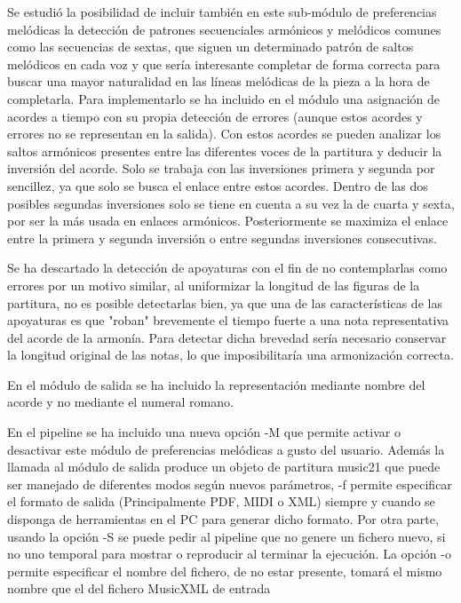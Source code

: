 Se estudió la posibilidad de incluir también en este sub-módulo de preferencias melódicas la detección de patrones secuenciales armónicos y melódicos comunes como las secuencias de sextas, que siguen un determinado patrón de saltos melódicos en cada voz y que sería interesante completar de forma correcta para buscar una mayor naturalidad en las líneas melódicas de la pieza a la hora de completarla. Para implementarlo se ha incluido en el módulo una asignación de acordes a tiempo con su propia detección de errores (aunque estos acordes y errores no se representan en la salida). Con estos acordes se pueden analizar los saltos armónicos presentes entre las diferentes voces de la partitura y deducir la inversión del acorde. Solo se trabaja con las inversiones primera y segunda por sencillez, ya que solo se busca el enlace entre estos acordes. Dentro de las dos posibles segundas inversiones solo se tiene en cuenta a su vez la  de cuarta y sexta, por ser la más usada en enlaces armónicos. Posteriormente se maximiza el enlace entre la primera y segunda inversión o entre segundas inversiones consecutivas.

Se ha descartado la detección de apoyaturas con el fin de no contemplarlas como errores por un motivo similar, al uniformizar la longitud de las figuras de la partitura, no es posible detectarlas bien, ya que una de las características de las apoyaturas es que "roban" brevemente el tiempo fuerte a una nota representativa del acorde de la armonía. Para detectar dicha brevedad sería necesario conservar la longitud original de las notas, lo que imposibilitaría una armonización correcta.

En el módulo de salida se ha incluido la representación mediante nombre del acorde y no mediante el numeral romano.

En el pipeline se ha incluido una nueva opción -M que permite activar o desactivar este módulo de preferencias melódicas a gusto del usuario. Además la llamada al módulo de salida produce un objeto de partitura music21 que puede ser manejado de diferentes modos según nuevos parámetros, -f permite especificar el formato de salida (Principalmente PDF, MIDI o XML) siempre y cuando se disponga de herramientas en el PC para generar dicho formato. Por otra parte, usando la opción -S se puede pedir al pipeline que no genere un fichero nuevo, si no uno temporal para mostrar o reproducir al terminar la ejecución. La opción -o permite especificar el nombre del fichero, de no estar presente, tomará el mismo nombre que el del fichero MusicXML de entrada

